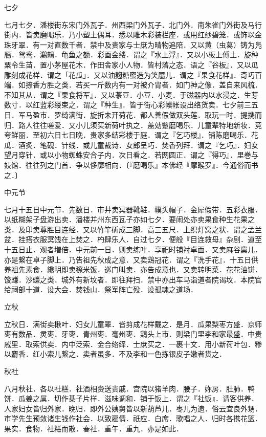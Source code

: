 \documentclass[]{article}
\begin{document}
七夕

七月七夕．潘楼街东宋门外瓦子．州西梁门外瓦子．北门外．南朱雀门外街及马行街内．皆卖磨喝乐．乃小塑土偶耳．悉以雕木彩装栏座．或用红纱碧笼．或饰以金珠牙翠．有一对直数千者．禁中及贵家与士庶为晴物追陪．又以黄（虫葛）铸为凫鴈．鸳鸯．鸂鶆．龟鱼之额．彩画金缕．谓之『水上浮』．又以小板上傅土．旋种粟令生苗．置小茅屋花木．作田舎家小人物．皆村落之态．语之『谷板』．又以瓜雕刻成花样．谓之「花瓜」．又以油麹糖蜜造为笑靥儿．谓之『果食花样』．奇巧百端．如捺香方胜之类．若买一斤数内有一对被介胄者．如门神之像．盖自来风梳．不知其从．谓之『果食将军』．又以菉豆．小豆．小麦．于磁器内以水浸之．生芽数寸．以红蓝彩缕束之．谓之『种生』．皆于街心彩幙帐设出络货卖．七夕前三五日．军马盈市．罗绮满街．旋折未开荷花．都人善假做双头莲．取玩一时．提携而归．路人往往嗟爱．又小儿须买新荷叶执之．盖効颦磨喝乐．儿童辈特地新妆．竞夸鲜丽．至初六日七日晩．贵家多结彩楼于庭．谓之『乞巧楼』．铺陈磨喝乐．花瓜．酒炙．笔砚．针线．或儿童裁诗．女郎呈巧．焚香列拜．谓之『乞巧』．妇女望月穿针．或以小物蜘蛛安合子内．次日看之．若网圆正．谓之『得巧』．里巻与妓馆．往往列之门首．争以侈靡相向．〔『磨喝乐』本佛经『摩睺罗』．今通俗而书之．〕

中元节

七月十五日中元节．先数日．市井卖冥器靴鞋．幞头帽子．金犀假带．五彩衣服．以纸糊架子盘游出卖．潘楼并州东西瓦子亦如七夕．要闹处亦卖果食种生花果之类．及印卖尊胜目连经．又以竹竿斫成三脚．高三五尺．上织灯窝之状．谓之孟兰盆．挂搭衣服冥饯在上焚之．杓肆乐人．自过七夕．便般『目连救母』杂剧．道至十五日止．观者増倍．中元前一日．则卖练叶．享祀时铺衬卓面．又卖麻谷窠儿．亦是繋在卓子脚上．乃告祖先秋成之意．又卖鶏冠花．谓之『洗手花』．十五日供养祖先素食．纔明即卖穄米饭．巡门叫卖．亦告成意也．又卖转明菜．花花油饼．馂豏．沙豏之类．城外有新坟者．即往拜扫．禁中亦出车马诣道者院谒坟．本院官给祠部十道．设大会．焚钱山．祭军阵亡殁．设孤魂之道场．

立秋

立秋日．满街卖楸叶．妇女儿童辈．皆剪成花样戴之．是月．瓜果梨枣方盛．京师枣有数品．灵枣．牙枣．青州枣．毫州枣．鶏头上市．则梁门里李和家最盛．中贵戚里．取索供卖．内中泛索．金合络绎．士庶买之．一裹十文．用小新荷叶包．糁以麝香．红小索儿繋之．卖者虽多．不及李和一色拣银皮子嫩者货之．

秋社

八月秋社．各以社糕．社酒相赍送贵戚．宫院以猪羊肉．腰子．妳房．肚肺．鸭饼．瓜姜之属．切作棊子片样．滋味调和．铺于饭上．谓之『社饭』．请客供养．人家妇女皆归外家．晩归．即外公姨舅皆以新葫芦儿．枣儿为遗．俗云宜良外甥．市学先生预敛诸生钱作社会．以致雇倩．祇应．白席．歌唱之人．归时各携花篮．果实．食物．社糕而散．春社．重午．重九．亦是如此．
\end{document}
